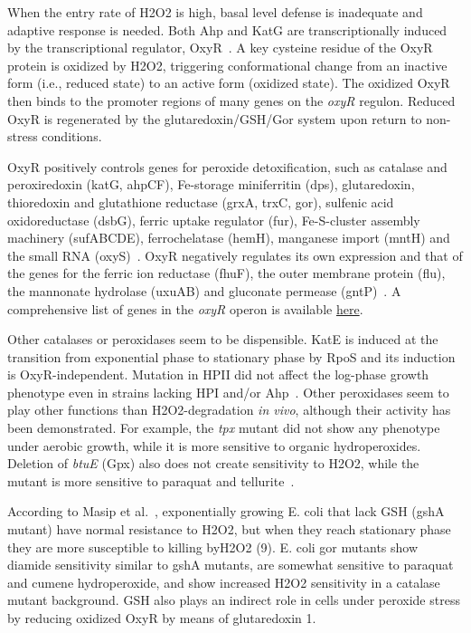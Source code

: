 \documentclass[10pt]{article}
\begin{document}
When the entry rate of H2O2 is high, basal level defense is inadequate and adaptive response is needed. Both Ahp and KatG are transcriptionally induced by the transcriptional regulator, OxyR~\cite{hillion2015thiol}. A key cysteine residue of the OxyR protein is oxidized by H2O2, triggering conformational change from an inactive form (i.e., reduced state) to an active form (oxidized state). The oxidized OxyR then binds to the promoter regions of many genes on the \textit{oxyR} regulon. Reduced OxyR is regenerated by the glutaredoxin/GSH/Gor system upon return to non-stress conditions.  

OxyR positively controls genes for peroxide detoxification, such as catalase and peroxiredoxin (katG, ahpCF), Fe-storage miniferritin (dps), glutaredoxin, thioredoxin and glutathione reductase (grxA, trxC, gor), sulfenic acid oxidoreductase (dsbG), ferric uptake regulator (fur), Fe-S-cluster assembly machinery (sufABCDE), ferrochelatase (hemH), manganese import (mntH) and the small RNA (oxyS)~\cite{hillion2015thiol}. OxyR negatively regulates its own expression and that of the genes for the ferric ion reductase (fhuF), the outer membrane protein (flu), the mannonate hydrolase (uxuAB) and gluconate permease (gntP)~\cite{hillion2015thiol}. A comprehensive list of genes in the \textit{oxyR} operon is available \href{https://ecocyc.org/gene?orgid=ECOLI\&id=EG10681\#tab=REGULON}{here}. 

Other catalases or peroxidases seem to be dispensible. KatE is induced at the transition from exponential phase to stationary phase by RpoS and its induction is OxyR-independent. Mutation in HPII did not affect the log-phase growth phenotype even in strains lacking HPI and/or Ahp~\cite{seaver2001alkyl}. Other peroxidases seem to play other functions than H2O2-degradation \textit{in vivo}, although their activity has been demonstrated. For example, the \textit{tpx} mutant did not show any phenotype under aerobic growth, while it is more sensitive to organic hydroperoxides. Deletion of \textit{btuE} (Gpx) also does not create sensitivity to H2O2, while the mutant is more sensitive to paraquat and tellurite~\cite{arenas2011escherichia}.

According to Masip et al.~\cite{masip2006many}, exponentially growing E. coli that lack GSH (gshA mutant) have normal resistance to H2O2, but when they reach stationary phase they are more susceptible to killing byH2O2 (9). E. coli gor mutants show diamide sensitivity similar
to gshA mutants, are somewhat sensitive to paraquat and cumene hydroperoxide, and show increased H2O2 sensitivity in a catalase mutant background. GSH also plays an indirect role in cells under peroxide stress by reducing oxidized OxyR by means of glutaredoxin 1.
\end{document}
